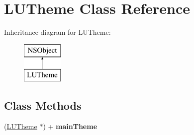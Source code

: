 \hypertarget{interface_l_u_theme}{}\section{L\+U\+Theme Class Reference}
\label{interface_l_u_theme}
Inheritance diagram for L\+U\+Theme\+:\begin{figure}[H]
\begin{center}
\leavevmode
\includegraphics[height=2.000000cm]{interface_l_u_theme}
\end{center}
\end{figure}
\subsection*{Class Methods}
\begin{DoxyCompactItemize}
\item 
\mbox{\label{interface_l_u_theme_af4e2d3ba41d2571007b40a6a19bb20cb}} 
(\mbox{\hyperlink{interface_l_u_theme}{L\+U\+Theme}} $\ast$) + {\bfseries main\+Theme}
\end{DoxyCompactItemize}
